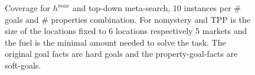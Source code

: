 \begin{figure}[ht]
\begin{tabular}{l|r|rrrrrrrrrr}
	\end{tabular}
	\caption{Coverage for $h^{max}$ and top-down meta-search, 10 instances per \# goals and \# properties combination.
	For nomystery and TPP is the size of the locations fixed to 6 locations respectively 5 markets and the fuel is the 
	minimal amount needed to solve the task.
	The original goal facts are hard goals and the property-goal-facts are soft-goals.}
\end{figure}



%
